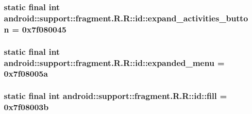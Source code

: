 \hypertarget{classandroid_1_1support_1_1fragment_1_1_r_1_1id_b90446c9ef1b2555c933ef62b7813429}{
\subsubsection[{expand\_\-activities\_\-button}]{\setlength{\rightskip}{0pt plus 5cm}static final int android::support::fragment.R.R::id::expand\_\-activities\_\-button = 0x7f080045}}
\label{classandroid_1_1support_1_1fragment_1_1_r_1_1id_b90446c9ef1b2555c933ef62b7813429}


\hypertarget{classandroid_1_1support_1_1fragment_1_1_r_1_1id_e474657f538a8b9adfc3a7b234ca6a24}{
\subsubsection[{expanded\_\-menu}]{\setlength{\rightskip}{0pt plus 5cm}static final int android::support::fragment.R.R::id::expanded\_\-menu = 0x7f08005a}}
\label{classandroid_1_1support_1_1fragment_1_1_r_1_1id_e474657f538a8b9adfc3a7b234ca6a24}


\hypertarget{classandroid_1_1support_1_1fragment_1_1_r_1_1id_649266287bab6d934b2a4295dde59604}{
\subsubsection[{fill}]{\setlength{\rightskip}{0pt plus 5cm}static final int android::support::fragment.R.R::id::fill = 0x7f08003b}}
\label{classandroid_1_1support_1_1fragment_1_1_r_1_1id_649266287bab6d934b2a4295dde59604}



